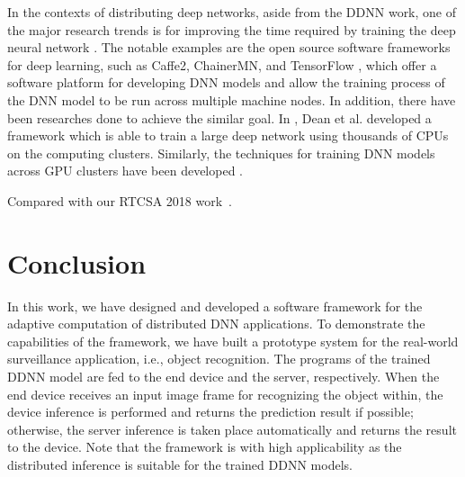 \documentclass[format=acmsmall, review=false, screen=true]{acmart}
\begin{document}
In the contexts of distributing deep networks, aside from the DDNN work, one of the major research trends is for improving the time required by training the deep neural network \cite{tensorflow16,Caffe217,Chainer17,dean2012large,iandola2016firecaffe,dean2015large}. The notable examples are the open source software frameworks for deep learning, such as Caffe2, ChainerMN, and TensorFlow \cite{tensorflow16,Caffe217,Chainer17,akiba2017chainermn}, which offer a software platform for developing DNN models and allow the training process of the DNN model to be run across multiple machine nodes. In addition, there have been researches done to achieve the similar goal. In \cite{dean2012large}, Dean et al. developed a framework which is able to train a large deep network using thousands of CPUs on the computing clusters. Similarly, the techniques for training DNN models across GPU clusters have been developed \cite{iandola2016firecaffe,dean2015large}.


Compared with our RTCSA 2018 work~\cite{DDNNRTCSA2018}.

\section{Conclusion}
\label{sec:conclusion}
In this work, we have designed and developed a software framework for the adaptive computation of distributed DNN applications. To demonstrate the capabilities of the framework, we have built a prototype system for the real-world surveillance application, i.e., object recognition. The programs of the trained DDNN model are fed to the end device and the server, respectively. When the end device receives an input image frame for recognizing the object within, the device inference is performed and returns the prediction result if possible; otherwise, the server inference is taken place automatically and returns the result to the device. Note that the framework is with high applicability as the distributed inference is suitable for the trained DDNN models.
\end{document}
